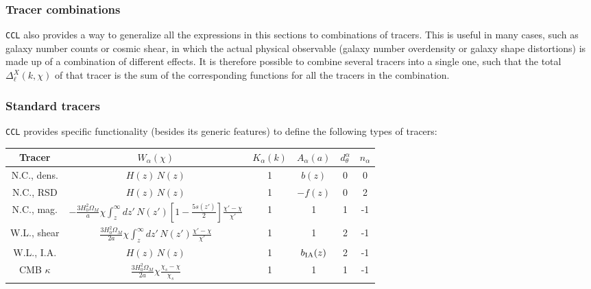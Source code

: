 \documentclass[\docopts]{\docclass}
\begin{document}
\subsubsection*{Tracer combinations}
  {\tt CCL} also provides a way to generalize all the expressions in this sections to combinations of tracers. This is useful in many cases, such as galaxy number counts or cosmic shear, in which the actual physical observable (galaxy number overdensity or galaxy shape distortions) is made up of a combination of different effects. It is therefore possible to combine several tracers into a single one, such that the total $\Delta^X_\ell(k,\chi)$ of that tracer is the sum of the corresponding functions for all the tracers in the combination.
  
\subsubsection*{Standard tracers}
  {\tt CCL} provides specific functionality (besides its generic features) to define the following types of tracers:
  \begin{table}[h]
    \centering
    \begin{tabular}{|c|c|c|c|c|c|}
      \hline
      Tracer & \(\displaystyle W_\alpha(\chi) \) & \(\displaystyle K_\alpha(k) \) & \(\displaystyle A_\alpha(a) \) & $d_\theta^\alpha$ & $n_\alpha$ \\
      \hline
      N.C., dens. & \(\displaystyle H(z)\,N(z)\)                                                                                                   & 1        & $b(z)$          & 0 &  0 \\
      N.C., RSD   & \(\displaystyle H(z)\,N(z)\)                                                                                                   & 1        & $-f(z)$         & 0 &  2 \\
      N.C., mag.  & \(\displaystyle -\frac{3H_0^2\Omega_M}{a}\chi\int_z^\infty dz'\,N(z')\left[1-\frac{5s(z')}{2}\right]\frac{\chi'-\chi}{\chi'}\) & 1        & 1               & 1 & -1 \\
      W.L., shear & \(\displaystyle \frac{3H_0^2\Omega_M}{2a}\chi\int_z^\infty dz'\,N(z')\frac{\chi'-\chi}{\chi'}\)                                & 1        & 1               & 2 & -1 \\
      W.L., I.A.  & \(\displaystyle H(z)\,N(z)\)                                                                                                   & 1        & $b_{\rm IA}(z)$ & 2 & -1 \\
      CMB $\kappa$ & \(\displaystyle \frac{3H_0^2\Omega_M}{2a}\chi\frac{\chi_s-\chi}{\chi_s}\)                                                      & 1        & 1               & 1 & -1 \\
      \hline
    \end{tabular}
  \end{table}
\end{document}
